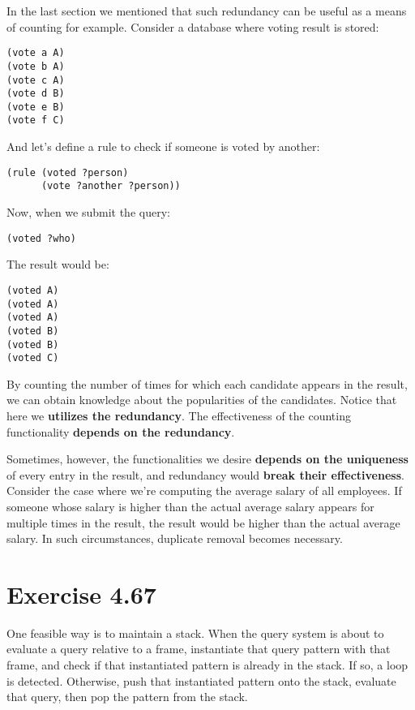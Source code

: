 \documentclass[../main.tex]{subfiles}
\begin{document}
In the last section we mentioned that such redundancy can be useful as a means of counting for example. Consider a database where voting result is stored:

\begin{lstlisting}
(vote a A)
(vote b A)
(vote c A)
(vote d B)
(vote e B)
(vote f C)
\end{lstlisting}

And let's define a rule to check if someone is voted by another:

\begin{lstlisting}
(rule (voted ?person)
      (vote ?another ?person))
\end{lstlisting}

Now, when we submit the query:

\begin{lstlisting}
(voted ?who)
\end{lstlisting}

The result would be:

\begin{lstlisting}
(voted A)
(voted A)
(voted A)
(voted B)
(voted B)
(voted C)
\end{lstlisting}

By counting the number of times for which each candidate appears in the result, we can obtain knowledge about the popularities of the candidates. Notice that here we \textbf{utilizes the redundancy}. The effectiveness of the counting functionality \textbf{depends on the redundancy}.

Sometimes, however, the functionalities we desire \textbf{depends on the uniqueness} of every entry in the result, and redundancy would \textbf{break their effectiveness}. Consider the case where we're computing the average salary of all employees. If someone whose salary is higher than the actual average salary appears for multiple times in the result, the result would be higher than the actual average salary. In such circumstances, duplicate removal becomes necessary.

\section{Exercise 4.67}

One feasible way is to maintain a stack. When the query system is about to evaluate a query relative to a frame, instantiate that query pattern with that frame, and check if that instantiated pattern is already in the stack. If so, a loop is detected. Otherwise, push that instantiated pattern onto the stack, evaluate that query, then pop the pattern from the stack.
\end{document}
